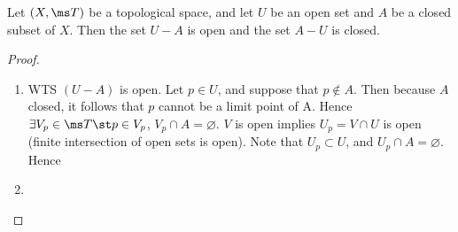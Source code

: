 \begin{problem}[3.15]
  Let $(X, \ms T)$ be a topological space, and let $U$ be an open set and $A$ be
  a closed subset of $X$. Then the set $U - A$ is open and the set $A - U$ is
  closed.
\end{problem}
\begin{proof}~
  \begin{enumerate}
    \item WTS $(U-A)$ is open. Let $p \in U$, and suppose that $p\not\in A$.
      Then because $A$ closed, it follows that $p$ cannot be a limit point of A.
      Hence $\exists V_p \in \ms T \st p \in V_p$, $V_p \cap A = \varnothing$.
      $V$ is open implies $U_p = V\cap U$ is open (finite intersection of open
      sets is open). Note that $U_p \subset U$, and $U_p \cap A = \varnothing$.
      Hence
    \item
  \end{enumerate}
\end{proof}

